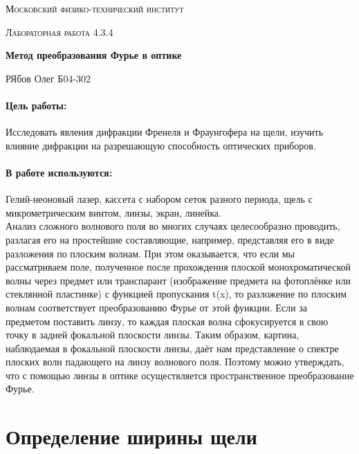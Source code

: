 \documentclass[a4paper, 12pt]{article}
\begin{document}
	
\begin{titlepage}
	\centering
	\vspace{5cm}
	{\scshape\LARGE Московский физико-технический институт \par}
	\vspace{4cm}
	{\scshape\Large Лабораторная работа 4.3.4 \par}
	\vspace{1cm}
	{\huge\bfseries Метод преобразования Фурье в оптике \par}
	\vspace{1cm}
	\vfill
\begin{flushright}
	{\large РЯбов Олег Б04-302}\par
\end{flushright}
	
\end{titlepage}

\paragraph*{Цель работы:} Исследовать явления дифракции Френеля и Фраунгофера на щели, изучить влияние дифракции на разрешающую способность оптических приборов.
\paragraph*{В работе используются:} Гелий-неоновый лазер, кассета с набором
сеток разного периода, щель с микрометрическим винтом, линзы,
экран, линейка.
$$$$
Анализ сложного волнового поля во многих случаях целесообразно проводить, разлагая его на простейшие составляющие, например, представляя его в виде разложения по плоским волнам. При этом оказывается, что если мы рассматриваем поле, полученное после прохождения плоской монохроматической волны через предмет или транспарант (изображение предмета на фотоплёнке или стеклянной пластинке) с функцией пропускания t(x), то разложение по плоским волнам соответствует преобразованию Фурье от этой функции. Если за предметом поставить линзу, то каждая плоская волна сфокусируется в свою точку в задней фокальной плоскости линзы. Таким образом, картина, наблюдаемая в фокальной плоскости линзы, даёт нам представление о спектре плоских волн падающего на линзу волнового поля. Поэтому можно утверждать, что с помощью линзы в оптике осуществляется пространственное преобразование Фурье.

\section*{Определение ширины щели}
\label{section_I}
\end{document}

